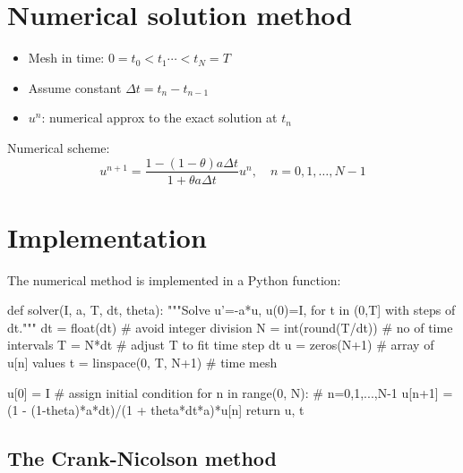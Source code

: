 \documentclass[%
oneside,                 %
final,                   %
10pt]{article}
\begin{document}

\section{Numerical solution method}


\begin{itemize}
 \item Mesh in time: $0= t_0< t_1 \cdots < t_N=T$

 \item Assume constant $\Delta t = t_{n}-t_{n-1}$

 \item $u^n$: numerical approx to the exact solution at $t_n$
\end{itemize}

\noindent

Numerical scheme:
   \[
   u^{n+1} = \frac{1 - (1-\theta) a\Delta t}{1 + \theta a\Delta t}u^n,
   \quad n=0,1,\ldots,N-1
   \]



\section{Implementation}

The numerical method is implemented in a Python function:

\bpycod
def solver(I, a, T, dt, theta):
    """Solve u'=-a*u, u(0)=I, for t in (0,T] with steps of dt."""
    dt = float(dt)           # avoid integer division
    N = int(round(T/dt))     # no of time intervals
    T = N*dt                 # adjust T to fit time step dt
    u = zeros(N+1)           # array of u[n] values
    t = linspace(0, T, N+1)  # time mesh

    u[0] = I                 # assign initial condition
    for n in range(0, N):    # n=0,1,...,N-1
        u[n+1] = (1 - (1-theta)*a*dt)/(1 + theta*dt*a)*u[n]
    return u, t
\epycod

\subsection{The Crank-Nicolson method}
\end{document}
